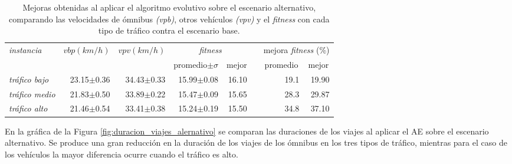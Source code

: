 \begin{table}[h]
	\renewcommand{\arraystretch}{1.2}
	\caption[Valores numéricos al aplicar el AE sobre el escenario alternativo.]{Mejoras obtenidas al aplicar el algoritmo evolutivo sobre el escenario alternativo, comparando las velocidades de ómnibus \textit{(vpb)}, otros vehículos \textit{(vpv)} y el \emph{fitness} con cada tipo de tráfico contra el escenario base.}
	\label{table:mejoras_trafico_alternativo_algoritmo}
	\centering
	\begin{tabular}{lrrrrrrr}
		\hline 
		\textit{instancia}& 
		$vbp(km/h)$& 
		$vpv(km/h)$&
		\multicolumn{2}{c}{\emph{fitness}}&  & 
		\multicolumn{2}{c}{mejora \emph{fitness} (\%)}\\  \cline{4-5} \cline{7-8}&     &     & \multicolumn{1}{c}{promedio$\pm\sigma$} & \multicolumn{1}{c}{mejor} &  & \multicolumn{1}{c}{promedio} & \multicolumn{1}{c}{mejor} \\ \hline

	\textit{tráfico bajo} & 23.15$\pm$0.36 & 34.43$\pm$0.33 & 15.99$\pm$0.08 & 16.10 & & 19.1& 19.90 \\
		\textit{tráfico medio} & 21.83$\pm$0.50  & 33.89$\pm$0.22 & 15.47$\pm$0.09& 15.65 & & 28.3 & 29.87\\
		\textit{tráfico alto} & 21.46$\pm$0.54  & 33.41$\pm$0.38 & 15.24$\pm$0.19& 15.50 & & 34.8 & 37.10\\	
		\hline		    
	\end{tabular}
\end{table}

En la gráfica de la Figura \ref{fig:duracion_viajes_alernativo} se comparan las duraciones de los viajes al aplicar el AE sobre el escenario alternativo. Se produce una gran reducción en la duración de los viajes de los ómnibus en los tres tipos de tráfico, mientras para el caso de los vehículos la mayor diferencia ocurre cuando el tráfico es alto.

